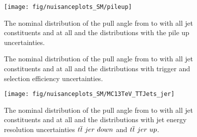 \begin{description}
\begin{figure}[hbtp]
\centering
\def\twidth{0.45}
\texttt{[image: fig/nuisanceplots\_SM/pileup]}
\caption{The nominal distribution of the pull angle from \leadingjet to \scndleadingjet with all jet constituents and at all \DeltaR and the distributions with the pile up uncertainties.}
\label{fig:pileup}
\end{figure}

\begin{figure}[hbtp]
\centering
\def\twidth{0.45}
\hfil
{}
\caption{The nominal distribution of the pull angle from \leadingjet to \scndleadingjet with all jet constituents and at all \DeltaR and the distributions with trigger and selection efficiency uncertainties.}
\label{fig:trigselcorrection}
\end{figure}

\begin{figure}[hbtp]
\centering
\def\twidth{0.45}
\texttt{[image: fig/nuisanceplots\_SM/MC13TeV\_TTJets\_jer]}
\caption{The nominal distribution of the pull angle from \leadingjet to \scndleadingjet with all jet constituents and at all \DeltaR and the distributions with jet energy resolution uncertainties $\ttbar\ jer\ down$ and $\ttbar\ jer\ up$.}
\label{fig:MC13TeV_TTJets_jer}
\end{figure}


\end{description}
